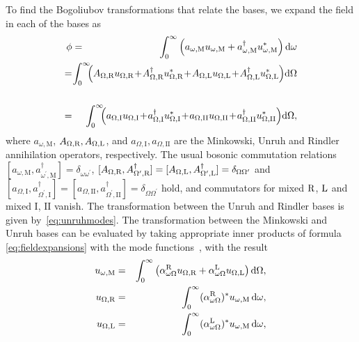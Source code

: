 To find the Bogoliubov transformations that relate the bases, 
we expand the field in each of the bases as 
\begin{eqnarray}
\!\!\phi &=&\!\! \int_0^\infty\left( a_{\omega,\text{M}} u_{\omega,\text{M}} + a_{\omega,\text{M}}^\dag u^{\ast}_{\omega,\text{M}} 
\right) \text{d}\omega\nonumber\\*
=& &\!\!\!\!\!\! \!\!\!\!\!\! \int_0^\infty \!\!\!\left( A_{\Omega,\text{\text{R}}} u_{\Omega,\text{\text{R}}}\!+\!A^{\dagger}_{\Omega,\text{\text{R}}} u^{\ast}_{\Omega,\text{\text{R}}}\!+\! A_{\Omega,\text{\text{L}}} u_{\Omega,\text{\text{L}}} \!+\! A^{\dagger}_{\Omega,\text{\text{L}}} u^{\ast}_{\Omega,\text{\text{L}}} \right)\! \text{d}\Omega\nonumber\\ \nonumber \\
=& &\!\!\!\!\!\! \!\!\!\!\!\!\int_0^\infty\!\!\!\left( a_{\Omega,\text{I}} u_{\Omega,\text{I}}\!+\!a^{\dagger}_{\Omega,\text{I}} u^{\ast}_{\Omega,\text{I}}\! +\! a_{\Omega,\text{II}} u_{\Omega,\text{II}}\!+\!a^{\dagger}_{\Omega,\text{II}} u^{\ast}_{\Omega,\text{II}}\right)\! \text{d}\Omega,
\label{eq:fieldexpansions}
\end{eqnarray}
where $a_{\omega,\text{M}}$, $A_{\Omega,\text{\text{R}}}, A_{\Omega,\text{\text{L}}}$, and $a_{\Omega,\text{I}}, a_{\Omega,\text{II}}$ are the Minkowski, Unruh and Rindler annihilation operators, respectively. The usual bosonic commutation relations $[a_{\omega,\text{M}},a^{\dagger}_{\omega^{\prime},\text{M}}] =\delta_{\omega\omega^{\prime}}$,  $[A_{\Omega,\text{\text{R}}},A^{\dagger}_{\Omega^{\prime},\text{\text{R}}}]=[A_{\Omega,\text{\text{L}}},A^{\dagger}_{\Omega^{\prime},\text{\text{L}}}]=\delta_{\Omega\Omega^{\prime}}$ and $[a_{\Omega,\text{I}},a^{\dagger}_{\Omega^{\prime},\text{I}}] = [a_{\Omega,\text{II}},a^{\dagger}_{\Omega^{\prime},\text{II}}]=\delta_{\Omega\Omega^{\prime}}$ hold, and commutators for mixed $\text{\text{R}}$, $\text{\text{L}}$ and mixed $\text{I}$, $\text{II}$ vanish. The transformation between the 
Unruh and Rindler bases is given by~\eqref{eq:unruhmodes}. The transformation between the Minkowski and Unruh bases can be evaluated by taking appropriate inner products of formula \eqref{eq:fieldexpansions} with the mode functions~\cite{Takagi}, 
with the result 
\begin{eqnarray}
u_{\omega,\text{M}} &=& \int_{0}^{\infty} \left(\alpha^\text{\text{R}}_{\omega\Omega} u_{\Omega,\text{\text{R}}}+  \alpha^\text{\text{L}}_{\omega\Omega} u_{\Omega,\text{\text{L}}}\right) \text{d}\Omega, \nonumber \\
u_{\Omega,\text{\text{R}}} &=& \int_{0}^{\infty} (\alpha^\text{\text{R}}_{\omega\Omega})^{\ast} u_{\omega,\text{M}} \, \text{d}\omega, \nonumber \\
u_{\Omega,\text{\text{L}}} &=& \int_{0}^{\infty}(\alpha^\text{\text{L}}_{\omega\Omega})^{\ast} u_{\omega,\text{M}} \, \text{d}\omega,
\label{eq:Mink-v-Unruh}
\end{eqnarray}
